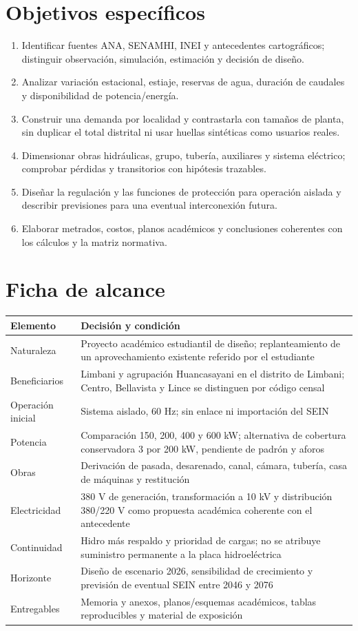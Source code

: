 \section{Objetivos específicos}
\begin{enumerate}
\item Identificar fuentes ANA, SENAMHI, INEI y antecedentes cartográficos; distinguir observación, simulación, estimación y decisión de diseño.
\item Analizar variación estacional, estiaje, reservas de agua, duración de caudales y disponibilidad de potencia/energía.
\item Construir una demanda por localidad y contrastarla con tamaños de planta, sin duplicar el total distrital ni usar huellas sintéticas como usuarios reales.
\item Dimensionar obras hidráulicas, grupo, tubería, auxiliares y sistema eléctrico; comprobar pérdidas y transitorios con hipótesis trazables.
\item Diseñar la regulación y las funciones de protección para operación aislada y describir previsiones para una eventual interconexión futura.
\item Elaborar metrados, costos, planos académicos y conclusiones coherentes con los cálculos y la matriz normativa.
\end{enumerate}

\section{Ficha de alcance}
\begin{longtable}{L{4.2cm}L{10cm}}
\toprule Elemento & Decisión y condición\\\midrule
Naturaleza & Proyecto académico estudiantil de diseño; replanteamiento de un aprovechamiento existente referido por el estudiante\\
Beneficiarios & Limbani y agrupación Huancasayani en el distrito de Limbani; Centro, Bellavista y Lince se distinguen por código censal\\
Operación inicial & Sistema aislado, 60 Hz; sin enlace ni importación del SEIN\\
Potencia & Comparación 150, 200, 400 y 600 kW; alternativa de cobertura conservadora 3 por 200 kW, pendiente de padrón y aforos\\
Obras & Derivación de pasada, desarenado, canal, cámara, tubería, casa de máquinas y restitución\\
Electricidad & 380 V de generación, transformación a 10 kV y distribución 380/220 V como propuesta académica coherente con el antecedente\\
Continuidad & Hidro más respaldo y prioridad de cargas; no se atribuye suministro permanente a la placa hidroeléctrica\\
Horizonte & Diseño de escenario 2026, sensibilidad de crecimiento y previsión de eventual SEIN entre 2046 y 2076\\
Entregables & Memoria y anexos, planos/esquemas académicos, tablas reproducibles y material de exposición\\
\bottomrule\end{longtable}

